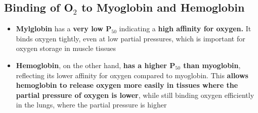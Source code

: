 \documentclass[10pt]{article}
\begin{document}
\pagebreak
\subsection*{Binding of O$_2$ to Myoglobin and Hemoglobin}
\begin{itemize}
    \item \textbf{Mylglobin} has a \textbf{very low P$_{50}$} indicating a \textbf{high affinity for oxygen.}  It binds oxygen tightly, even at low partial pressures, which is important for oxygen storage in muscle tissues
    \item \textbf{Hemoglobin}, on the other hand, \textbf{has a higher P$_{50}$ than myoglobin}, reflecting its lower affinity for oxygen compared to myoglobin.  This \textbf{allows hemoglobin to release oxygen more easily in tissues where the partial pressure of oxygen is lower}, while still binding oxygen efficiently in the lungs, where the partial pressure is higher
\end{itemize}
\end{document}
